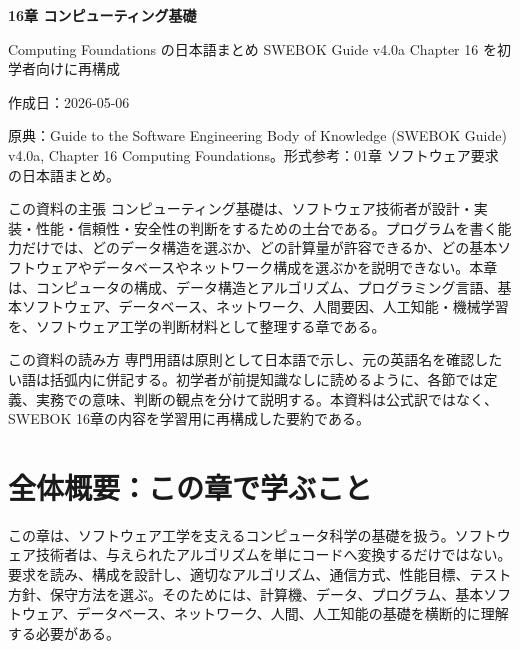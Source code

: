 \documentclass[a4paper,11pt]{ltjsarticle}
\begin{document}
\begin{center}
{\LARGE\bfseries 16章 コンピューティング基礎}\par
\vspace{2mm}
{\large Computing Foundations の日本語まとめ
SWEBOK Guide v4.0a Chapter 16 を初学者向けに再構成}\par
\vspace{2mm}
{作成日：2026-05-06}\par
\end{center}

原典：Guide to the Software Engineering Body of Knowledge (SWEBOK Guide) v4.0a, Chapter 16 Computing Foundations。形式参考：01章 ソフトウェア要求の日本語まとめ。

\begin{importantbox}{この資料の主張}
コンピューティング基礎は、ソフトウェア技術者が設計・実装・性能・信頼性・安全性の判断をするための土台である。プログラムを書く能力だけでは、どのデータ構造を選ぶか、どの計算量が許容できるか、どの基本ソフトウェアやデータベースやネットワーク構成を選ぶかを説明できない。本章は、コンピュータの構成、データ構造とアルゴリズム、プログラミング言語、基本ソフトウェア、データベース、ネットワーク、人間要因、人工知能・機械学習を、ソフトウェア工学の判断材料として整理する章である。

\end{importantbox}

\begin{importantbox}{この資料の読み方}
専門用語は原則として日本語で示し、元の英語名を確認したい語は括弧内に併記する。初学者が前提知識なしに読めるように、各節では定義、実務での意味、判断の観点を分けて説明する。本資料は公式訳ではなく、SWEBOK 16章の内容を学習用に再構成した要約である。

\end{importantbox}

\tableofcontents
\newpage

\section{全体概要：この章で学ぶこと}

この章は、ソフトウェア工学を支えるコンピュータ科学の基礎を扱う。ソフトウェア技術者は、与えられたアルゴリズムを単にコードへ変換するだけではない。要求を読み、構成を設計し、適切なアルゴリズム、通信方式、性能目標、テスト方針、保守方法を選ぶ。そのためには、計算機、データ、プログラム、基本ソフトウェア、データベース、ネットワーク、人間、人工知能の基礎を横断的に理解する必要がある。
\end{document}
